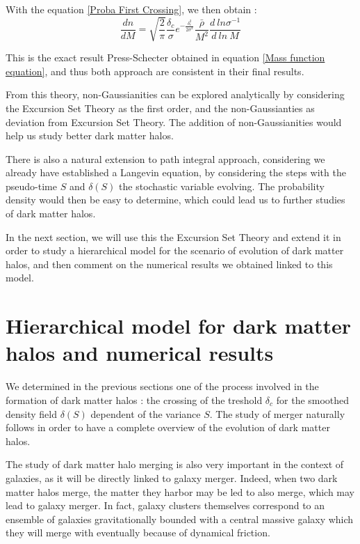 With the equation \ref{Proba First Crossing}, we then obtain :
\begin{equation}
\label{PS Same}
\frac{dn}{dM} = \sqrt{\frac{2}{\pi}} \frac{\delta_c}{\sigma} e^{-\frac{\delta_c^2}{2\sigma^2}} \frac{\bar{\rho}}{M^2} \frac{d \ ln \sigma^{-1}}{d\ ln \ M}
\end{equation}

This is the exact result Press-Schecter obtained in equation \ref{Mass function equation}, and thus both approach are consistent in their final results.

From this theory, non-Gaussianities can be explored analytically by considering the Excursion Set Theory as the first order, and the non-Gaussianties as deviation from Excursion Set Theory. The addition of non-Gaussianities would help us study better dark matter halos.

There is also a natural extension to path integral approach, considering we already have established a Langevin equation, by considering the steps with the pseudo-time $S$ and $\delta(S)$ the stochastic variable evolving. The probability density would then be easy to determine, which could lead us to further studies of dark matter halos\cite{Maggiore}.

In the next section, we will use this the Excursion Set Theory and extend it in order to study a hierarchical model for the scenario of evolution of dark matter halos, and then comment on the numerical results we obtained linked to this model.




\section{Hierarchical model for dark matter halos and numerical results}
\label{Section III}

We determined in the previous sections one of the process involved in the formation of dark matter halos : the crossing of the treshold $\delta_c$ for the smoothed density field $\delta(S)$ dependent of the variance $S$. The study of merger naturally follows in order to have a complete overview of the evolution of dark matter halos.

The study of dark matter halo merging is also very important in the context of galaxies, as it will be directly linked to galaxy merger. Indeed, when two dark matter halos merge, the matter they harbor may be led to also merge, which may lead to galaxy merger.
In fact, galaxy clusters themselves correspond to an ensemble of galaxies gravitationally bounded with a central massive galaxy which they will merge with eventually because of dynamical friction.

